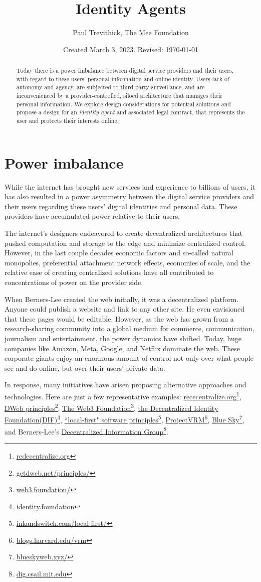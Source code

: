 \documentclass[11pt, oneside]{article}   	%
\title{Identity Agents}
\author{Paul Trevithick, The Mee Foundation}
\date{Created March 3, 2023. Revised: \today}							%
\newcommand{\hyperfootnote}[1][]{\def\ArgI{{#1}}\hyperfootnoteRelay}
\newcommand\hyperfootnoteRelay[2][]{\href{#1#2}{\ArgI}\footnote{\href{#1#2}{#2}}}
\begin{document}
\maketitle
\begin{abstract}
Today there is a power imbalance between digital service providers and their users, with regard to these users' personal information and online identity. Users lack of autonomy and agency, are subjected to third-party surveillance, and are inconvenienced by a provider-controlled, siloed architecture that manages their personal information. We explore design considerations for potential solutions and propose a design for an \emph{identity agent} and associated legal contract, that represents the user and protects their interests online.
\end{abstract}

\section{Power imbalance}
While the internet has brought new services and experience to billions of users, it has also resulted in a power asymmetry between the digital service providers and their users regarding these users' digital identities and personal data. These providers have accumulated power relative to their users.

The internet's designers endeavored to create decentralized architectures that pushed computation and storage to the edge and minimize centralized control. However, in the last couple decades economic factors and so-called natural monopolies, preferential attachment network effects, economies of scale, and the relative ease of creating centralized solutions have all contributed to concentrations of power on the provider side. 

When Berners-Lee created the web initially, it was a decentralized platform. Anyone could publish a website and link to any other site. He even envisioned that these pages would be editable. However, as the web has grown from a research-sharing community into a global medium for commerce, communication, journalism and entertainment, the power dynamics have shifted. Today, huge companies like Amazon, Meta, Google, and Netflix dominate the web. These corporate giants enjoy an enormous amount of control not only over what people see and do online, but over their users' private data.\cite{Finley2017}

In response, many initiatives have arisen proposing alternative approaches and technologies. Here are just a few representative examples: \hyperfootnote[rececentralize.org][https://]{redecentralize.org}, \hyperfootnote[DWeb principles][https://]{getdweb.net/principles/}, \hyperfootnote[The Web3 Foundation][https://]{web3.foundation/}, \hyperfootnote[the Decentralized Identity Foundation(DIF)][https://]{identity.foundation}, \hyperfootnote[``local-first" software principles][https://]{inkandswitch.com/local-first/}, \hyperfootnote[ProjectVRM][https://]{blogs.harvard.edu/vrm}, \hyperfootnote[Blue Sky][https://]{blueskyweb.xyz/}, and Berners-Lee's \hyperfootnote[Decentralized Information Group][https://]{dig.csail.mit.edu}. 
\end{document}
